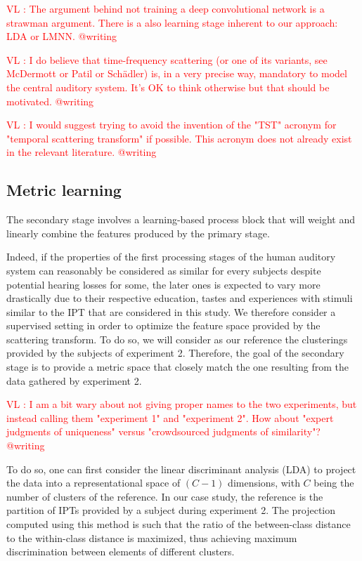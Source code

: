 \documentclass{article}
\newcommand{\ipt}{IPT\xspace}
\newcommand{\ipts}{IPTs\xspace}
\newcommand{\vl}[1]{\textcolor{red}{VL : #1}}
\begin{document}
\vl{The argument behind not training a deep convolutional network is a strawman argument.
There is a also learning stage inherent to our approach: LDA or LMNN. @writing}

\vl{I do believe that time-frequency scattering (or one of its variants, see McDermott or Patil or Sch\"{a}dler)
is, in a very precise way, mandatory to model the central auditory system. It's OK to think otherwise but that
should be motivated. @writing}

\vl{I would suggest trying to avoid the invention of the "TST" acronym for "temporal scattering transform" if possible.
This acronym does not already exist in the relevant literature. @writing}

\subsection{Metric learning}

The secondary stage involves a learning-based process block that will weight and linearly combine the features produced by the primary stage.

Indeed, if the properties of the first processing stages of the human auditory system can reasonably be considered as similar for every subjects despite potential hearing losses for some, the later ones is expected to vary more drastically due to their respective education, tastes and experiences with stimuli similar to the \ipt that are considered in this study. We therefore consider a supervised setting in order to optimize the feature space provided by the scattering transform. To do so, we will consider as our reference the clusterings provided by the subjects of experiment 2. Therefore, the goal of the secondary stage is to provide a metric space that closely match the one resulting from the data gathered by experiment 2.

\vl{I am a bit wary about not giving proper names to the two experiments, but instead calling them "experiment 1" and "experiment 2".
How about "expert judgments of uniqueness" versus "crowdsourced judgments of similarity"? @writing}

To do so, one can first consider the linear discriminant analysis (LDA) \cite{duda2000pattern} to project the data into a representational space of $(C-1)$ dimensions, with $C$ being the number of clusters of the reference. In our case study, the reference is the partition of \ipts provided by a subject during experiment 2. The projection computed using this method is such that the ratio of the between-class distance to the within-class distance is maximized, thus achieving maximum discrimination between elements of different clusters.
\end{document}
